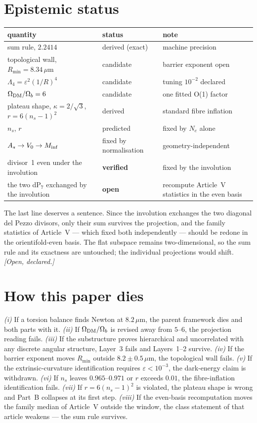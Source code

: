 \section{Epistemic status}
\begin{center}\small
\begin{tabular}{lll}\toprule
quantity & status & note\\\midrule
sum rule, $2.2414$ & derived (exact) & machine precision\\
topological wall, $R_{\min}=8.34\,\mu$m & candidate & barrier exponent open\\
$\Lambda_4=\varepsilon^2(1/R)^4$ & candidate & tuning $10^{-2}$ declared\\
$\Omega_{\rm DM}/\Omega_b=6$ & candidate & one fitted O(1) factor\\
plateau shape, $\kappa=2/\sqrt3$, $r=6(n_s-1)^2$ & derived & standard fibre inflation\\
$n_s$, $r$ & predicted & fixed by $N_e$ alone\\
$A_s\to V_0\to M_{\rm inf}$ & fixed by normalisation & geometry-independent\\
divisor~1 even under the involution & \textbf{verified} & fixed by the involution\\
the two dP$_7$ exchanged by the involution & \textbf{open} & recompute Article~V statistics in the even basis\\\bottomrule
\end{tabular}
\end{center}
The last line deserves a sentence. Since the involution exchanges the two diagonal del Pezzo divisors, only their sum survives the projection, and the family statistics of Article~V --- which fixed both independently --- should be redone in the orientifold-even basis. The flat subspace remains two-dimensional, so the sum rule and its exactness are untouched; the individual projections would shift. \textit{[Open, declared.]}

\section{How this paper dies}
\emph{(i)} If a torsion balance finds Newton at $8.2\,\mu$m, the parent framework dies and both parts with it. \emph{(ii)} If $\Omega_{\rm DM}/\Omega_b$ is revised away from $5$--$6$, the projection reading fails. \emph{(iii)} If the substructure proves hierarchical and uncorrelated with any discrete angular structure, Layer~3 fails and Layers~1--2 survive. \emph{(iv)} If the barrier exponent moves $R_{\min}$ outside $8.2\pm0.5\,\mu$m, the topological wall fails. \emph{(v)} If the extrinsic-curvature identification requires $\varepsilon<10^{-3}$, the dark-energy claim is withdrawn. \emph{(vi)} If $n_s$ leaves $0.965$--$0.971$ or $r$ exceeds $0.01$, the fibre-inflation identification fails. \emph{(vii)} If $r=6(n_s-1)^2$ is violated, the plateau shape is wrong and Part~B collapses at its first step. \emph{(viii)} If the even-basis recomputation moves the family median of Article~V outside the window, the class statement of that article weakens --- the sum rule survives.



\toolsstatement
{}



